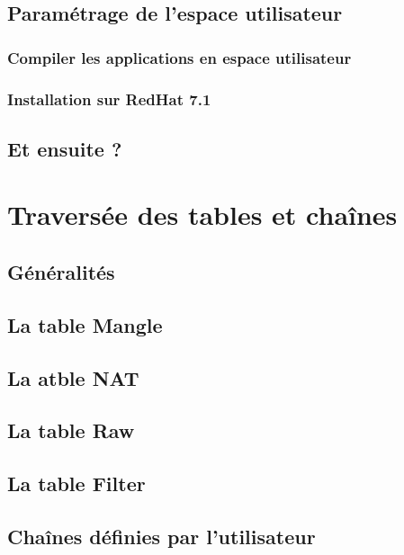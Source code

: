 \documentclass[a4paper,11pt]{report}
\begin{document}
\section{Paramétrage de l'espace utilisateur}

\subsection{Compiler les applications en espace utilisateur}

\subsection{Installation sur RedHat 7.1}

\section{Et ensuite ?}

\chapter{Traversée des tables et chaînes}

\section{Généralités}

\section{La table Mangle}

\section{La atble NAT}

\section{La table Raw}

\section{La table Filter}

\section{Chaînes définies par l'utilisateur}
\end{document}
